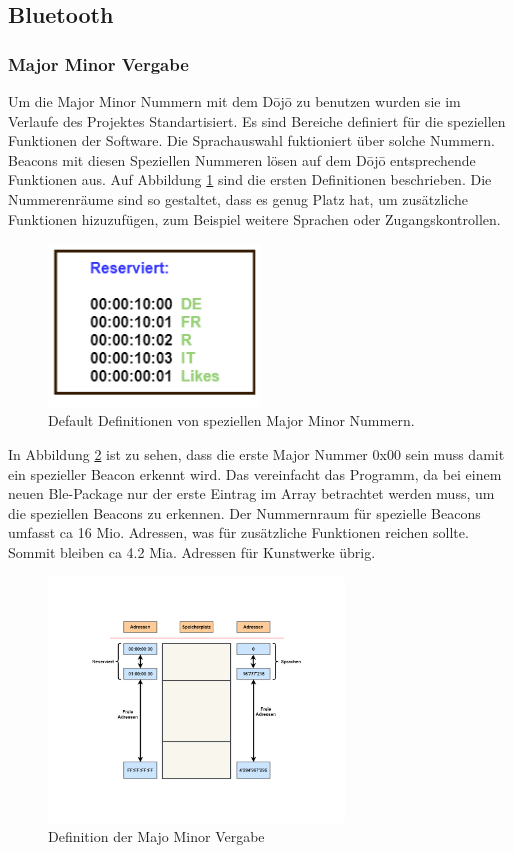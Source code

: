 \subsection{Bluetooth}\label{sec:bluetooth}


\subsubsection{Major Minor Vergabe}
Um die Major Minor Nummern mit dem Dōjō zu benutzen wurden sie im Verlaufe des Projektes Standartisiert. Es sind Bereiche definiert für die speziellen Funktionen der Software. Die Sprachauswahl fuktioniert über solche Nummern. Beacons mit diesen Speziellen Nummeren lösen auf dem Dōjō entsprechende Funktionen aus. Auf Abbildung \ref{fig:Bluetooth_def_MM} sind die ersten Definitionen beschrieben. Die Nummerenräume sind so gestaltet, dass es genug Platz hat, um zusätzliche Funktionen hizuzufügen, zum Beispiel weitere Sprachen oder Zugangskontrollen.

\begin{figure}[htbp!!!!]
	\centering
	\includegraphics[width=0.5\textwidth]{Data/Reserviert_picture.png}
	\caption[Software:Definierte MM]{Default Definitionen von speziellen Major Minor Nummern.}
	\label{fig:Bluetooth_def_MM}
\end{figure}

In Abbildung \ref{fig:Bluetooth_MM_Vergabe} ist zu sehen, dass die erste Major Nummer 0x00 sein muss damit ein spezieller Beacon erkennt wird. Das vereinfacht das Programm, da bei einem neuen Ble-Package nur der erste Eintrag im Array betrachtet werden muss, um die speziellen Beacons zu erkennen. Der Nummernraum für spezielle Beacons umfasst ca 16 Mio. Adressen, was für zusätzliche Funktionen reichen sollte. Sommit bleiben ca 4.2 Mia. Adressen für Kunstwerke übrig.


\begin{figure}[htbp!!!!]
	\centering
	\includegraphics[width=0.7\textwidth]{Data/Speicheradressen_picture.png}
	\caption[Software:MM Vergabe]{Definition der Majo Minor Vergabe}
	\label{fig:Bluetooth_MM_Vergabe}
\end{figure}



